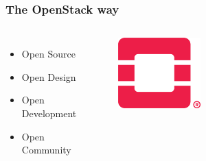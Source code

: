 \documentclass[aspectratio=169,11pt,hyperref={colorlinks=true}]{beamer}
\begin{document}
\begin{frame}
  \frametitle{The OpenStack way}
  \begin{columns}
      \begin{itemize}
          \item{Open Source}
          \item{Open Design}
          \item{Open Development}
          \item{Open Community}
      \end{itemize}
      \begin{figure}
      \begin{center}
        \includegraphics[width=0.4\textwidth]{pictures/OpenStack-Logo-Mark.png}
      \end{center}
      \end{figure}
  \end{columns}
\end{frame}
\end{document}
